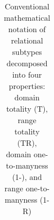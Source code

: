 \documentclass{article}
\begin{document}
\begin{table}[H]
\begin{tabular}{|c|c|c|c|c|}
    \hline
  \end{tabular}
  \caption{Conventional mathematical notation of relational subtypes decomposed into four properties: domain totality (T), range totality (TR), domain one-to-manyness (1-), and range one-to-manyness (1-R)}
  \label{tab:relSubtype}
\end{table}
\end{document}
